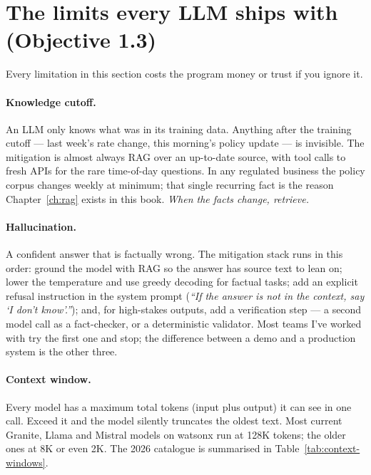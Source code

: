 
\section{The limits every LLM ships with (Objective 1.3)}

Every limitation in this section costs the program money or trust if you ignore it.

\paragraph{Knowledge cutoff.} An LLM only knows what was in its training data. Anything after the training cutoff --- last week's rate change, this morning's policy update --- is invisible. The mitigation is almost always RAG over an up-to-date source, with tool calls to fresh APIs for the rare time-of-day questions. In any regulated business the policy corpus changes weekly at minimum; that single recurring fact is the reason Chapter~\ref{ch:rag} exists in this book. \emph{When the facts change, retrieve.}

\paragraph{Hallucination.} A confident answer that is factually wrong. The mitigation stack runs in this order: ground the model with RAG so the answer has source text to lean on; lower the temperature and use greedy decoding for factual tasks; add an explicit refusal instruction in the system prompt (\emph{``If the answer is not in the context, say `I don't know'.''}); and, for high-stakes outputs, add a verification step --- a second model call as a fact-checker, or a deterministic validator. Most teams I've worked with try the first one and stop; the difference between a demo and a production system is the other three.

\paragraph{Context window.} Every model has a maximum total tokens (input plus output) it can see in one call. Exceed it and the model silently truncates the oldest text. Most current Granite, Llama and Mistral models on watsonx run at 128K tokens; the older ones at 8K or even 2K. The 2026 catalogue is summarised in Table~\ref{tab:context-windows}.

